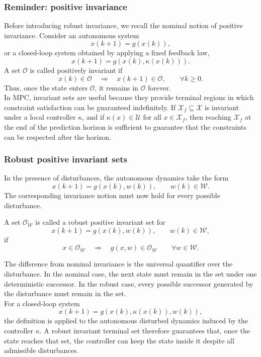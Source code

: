 \subsubsection{Reminder: positive invariance}
Before introducing robust invariance, we recall the nominal notion of positive invariance. Consider
an autonomous system
\[
    x(k+1) = g(x(k)),
\]
or a closed-loop system obtained by applying a fixed feedback law,
\[
    x(k+1) = g(x(k),\kappa(x(k))).
\]
A set \(\mathcal{O}\) is called positively invariant if
\[
    x(k) \in \mathcal{O}
    \quad \Longrightarrow \quad
    x(k+1) \in \mathcal{O},
    \qquad \forall k \geq 0.
\]
Thus, once the state enters \(\mathcal{O}\), it remains in \(\mathcal{O}\) forever.\\
In MPC, invariant sets are useful because they provide terminal regions in which constraint
satisfaction can be guaranteed indefinitely. If \(\mathcal{X}_f \subseteq \mathcal{X}\) is invariant
under a local controller \(\kappa\), and if \(\kappa(x) \in \mathcal{U}\) for all
\(x \in \mathcal{X}_f\), then reaching \(\mathcal{X}_f\) at the end of the prediction horizon is
sufficient to guarantee that the constraints can be respected after the horizon.

\subsubsection{Robust positive invariant sets}

In the presence of disturbances, the autonomous dynamics take the form
\[
    x(k+1) = g(x(k),w(k)),
    \qquad w(k) \in \mathcal{W}.
\]
The corresponding invariance notion must now hold for every possible disturbance.

\begin{theorembox}
A set \(\mathcal{O}_{\mathcal{W}}\) is called a robust positive invariant set for
\[
    x(k+1) = g(x(k),w(k)), \qquad w(k) \in \mathcal{W},
\]
if
\[
    x \in \mathcal{O}_{\mathcal{W}}
    \quad \Longrightarrow \quad
    g(x,w) \in \mathcal{O}_{\mathcal{W}}
    \qquad \forall w \in \mathcal{W}.
\]
\end{theorembox}

The difference from nominal invariance is the universal quantifier over the disturbance. In the
nominal case, the next state must remain in the set under one deterministic successor. In the
robust case, every possible successor generated by the disturbance must remain in the set.\\
For a closed-loop system
\[
    x(k+1) = g(x(k),\kappa(x(k)),w(k)),
\]
the definition is applied to the autonomous disturbed dynamics induced by the controller
\(\kappa\). A robust invariant terminal set therefore guarantees that, once the state reaches that
set, the controller can keep the state inside it despite all admissible disturbances.

